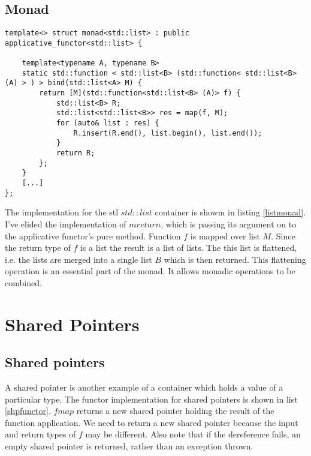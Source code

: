 \documentclass[12pt,fleqn]{article}
\begin{document}
%
%
\subsection{Monad}
%
  
  
%
%
%
\begin{minipage}{\linewidth}
\begin{lstlisting}[caption=monad for std::list, label=listmonad]
template<> struct monad<std::list> : public applicative_functor<std::list> {

	template<typename A, typename B>
	static std::function < std::list<B> (std::function< std::list<B> (A) > ) > bind(std::list<A> M) {
		return [M](std::function<std::list<B> (A)> f) {
			std::list<B> R;
			std::list<std::list<B>> res = map(f, M);
			for (auto& list : res) {
				R.insert(R.end(), list.begin(), list.end());
			}
			return R;
		};
	}
    [...]
};
\end{lstlisting}
\end{minipage}
%
%
%
The implementation for the stl $std::list$ container is showm in listing \ref{listmonad}.
I've elided the implementation of $mreturn$, which is passing its argument on to the applicative functor's pure method.
Function $f$ is mapped over list $M$. Since the return type of $f$ is a list the result is a list of lists.
The this list is flattened, i.e. the lists are merged into a single list $B$ which is then returned.
This flattening operation is an essential part of the monad. It allows monadic operations to be combined.

\section{Shared Pointers}

  

\subsection{Shared pointers}
%
%
%

A shared pointer is another example of a container which holds a value of a particular type.
The functor implementation for shared pointers is shown in list \ref{shpfunctor}. 
$fmap$ returns a new shared pointer holding the result of the function application.
We need to return a new shared pointer because the input and return types of $f$ may be different. 
Also note that if the dereference fails, an empty shared pointer is returned, rather than an exception thrown.
\end{document}
